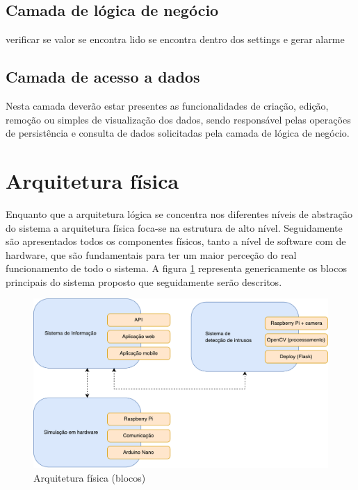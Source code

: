 \subsection{Camada de lógica de negócio}



verificar se valor se encontra lido se encontra dentro dos settings e gerar alarme 


\subsection{Camada de acesso a dados}


Nesta camada deverão estar presentes as funcionalidades de criação, edição, remoção ou simples de visualização dos dados, sendo responsável pelas operações de persistência e consulta de dados solicitadas pela camada de lógica de negócio.




\newpage
\section{Arquitetura física}


Enquanto que a arquitetura lógica se concentra nos diferentes níveis de abstração do sistema a arquitetura física foca-se na estrutura de alto nível.  
Seguidamente são apresentados todos os componentes físicos, tanto  a nível de software com de hardware, que são fundamentais para ter um maior perceção do real funcionamento de todo o sistema. 
A figura \ref{fisicablocos} representa genericamente os blocos principais do sistema proposto que seguidamente serão descritos. 


\begin{figure}[h]
	\centering
	\includegraphics[scale=0.45]{esquemas/esquema-blocos.pdf}
	\caption{Arquitetura física (blocos)}
	\label{fisicablocos}
\end{figure}


